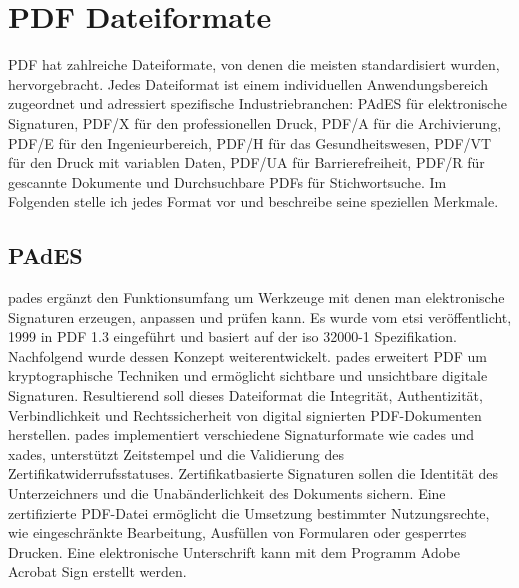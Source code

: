 \section{PDF Dateiformate}
PDF hat zahlreiche Dateiformate, von denen die meisten standardisiert wurden, hervorgebracht. Jedes Dateiformat ist einem individuellen Anwendungsbereich zugeordnet und adressiert spezifische Industriebranchen: PAdES für elektronische Signaturen, PDF/X für den professionellen Druck, PDF/A für die Archivierung, PDF/E für den Ingenieurbereich, PDF/H für das Gesundheitswesen, PDF/VT für den Druck mit variablen Daten, PDF/UA für Barrierefreiheit, PDF/R für gescannte Dokumente und Durchsuchbare PDFs für Stichwortsuche. Im Folgenden stelle ich jedes Format vor und beschreibe seine speziellen Merkmale. 

\subsection{PAdES}
\gls{pades} ergänzt den Funktionsumfang um Werkzeuge mit denen man elektronische Signaturen erzeugen, anpassen und prüfen kann. Es wurde vom \gls{etsi} veröffentlicht, 1999 in PDF 1.3 eingeführt und basiert auf der \gls{iso} 32000-1 Spezifikation. Nachfolgend wurde dessen Konzept weiterentwickelt. \gls{pades} erweitert PDF um kryptographische Techniken und ermöglicht sichtbare und unsichtbare digitale Signaturen. Resultierend soll dieses Dateiformat die Integrität, Authentizität, Verbindlichkeit und Rechtssicherheit von digital signierten PDF-Dokumenten herstellen. \gls{pades} implementiert verschiedene Signaturformate wie \gls{cades} und \gls{xades}, unterstützt Zeitstempel und die Validierung des Zertifikatwiderrufsstatuses. Zertifikatbasierte Signaturen sollen die Identität des Unterzeichners und die Unabänderlichkeit des Dokuments sichern. Eine zertifizierte PDF-Datei ermöglicht die Umsetzung bestimmter Nutzungsrechte, wie eingeschränkte Bearbeitung, Ausfüllen von Formularen oder gesperrtes Drucken. Eine elektronische Unterschrift kann mit dem Programm Adobe Acrobat Sign erstellt werden. \cite{adobe-pdf-pades}


